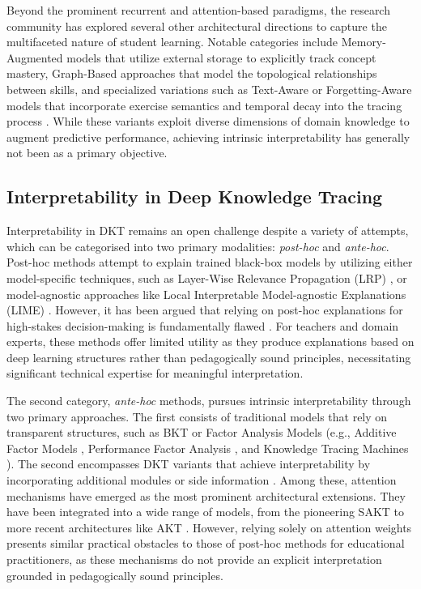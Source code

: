 \documentclass[applsci,article,submit,moreauthors,pdftex]{Definitions/mdpi}
\begin{document}
Beyond the prominent recurrent and attention-based paradigms, the research community has explored several other architectural directions to capture the multifaceted nature of student learning. Notable categories include Memory-Augmented models that utilize external storage to explicitly track concept mastery, Graph-Based approaches that model the topological relationships between skills, and specialized variations such as Text-Aware or Forgetting-Aware models that incorporate exercise semantics and temporal decay into the tracing process \citep{abdelrahman2023knowledge}. While these variants exploit diverse dimensions of domain knowledge to augment predictive performance, achieving intrinsic interpretability has generally not been  as a primary objective.

\subsection{Interpretability in Deep Knowledge Tracing} \label{sec_interpretability}

Interpretability in DKT remains an open challenge despite a variety of attempts, which can be categorised into two primary modalities: \textit{post-hoc} and \textit{ante-hoc}. Post-hoc methods attempt to explain trained black-box models by utilizing either model-specific techniques, such as Layer-Wise Relevance Propagation (LRP) \citep{bach2015pixel}, or model-agnostic approaches like Local Interpretable Model-agnostic Explanations (LIME) \citep{ribeiro2016should}. However, it has been argued that relying on post-hoc explanations for high-stakes decision-making is fundamentally flawed \citep{rudin2019stop}. For teachers and domain experts, these methods offer limited utility as they produce explanations based on deep learning structures rather than pedagogically sound principles, necessitating significant technical expertise for meaningful interpretation.

The second category, \textit{ante-hoc} methods, pursues intrinsic interpretability through two primary approaches. The first consists of traditional models that rely on transparent structures, such as BKT or Factor Analysis Models (e.g., Additive Factor Models \citep{cen2008comparing}, Performance Factor Analysis \citep{pavlik2009performance}, and Knowledge Tracing Machines \citep{vie2019knowledge}). The second encompasses DKT variants that achieve interpretability by incorporating additional modules or  side information \citep{bai2024survey}. Among these, attention mechanisms have emerged as the most prominent architectural extensions. They have been integrated into a wide range of models, from the pioneering SAKT \citep{Pandey2019384} to more recent architectures like AKT \citep{ghosh2020context}. However, relying solely on attention weights presents similar practical obstacles to those of post-hoc methods for educational practitioners, as these mechanisms do not provide an explicit interpretation grounded in pedagogically sound principles. 
\end{document}
